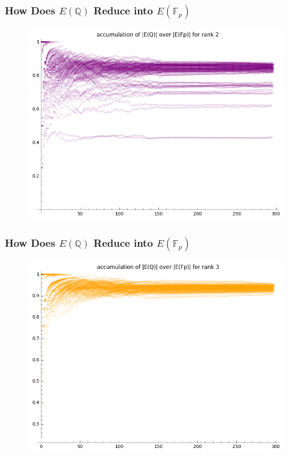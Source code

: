\documentclass{beamer}
\newcommand{\Q}{\mathbb{Q}}
\newcommand{\F}{\mathbb{F}}
\begin{document}
\begin{frame}
\frametitle{How Does $E(\Q)$ Reduce into $E(\F_p)$}
\begin{figure}[H]
\centering
\includegraphics[width=.8\textwidth]{accumulation_index_2}
\end{figure}
\end{frame}

\begin{frame}
\frametitle{How Does $E(\Q)$ Reduce into $E(\F_p)$}
\begin{figure}[H]
\centering
\includegraphics[width=.8\textwidth]{accumulation_index_3}
\end{figure}
\end{frame}
\end{document}
